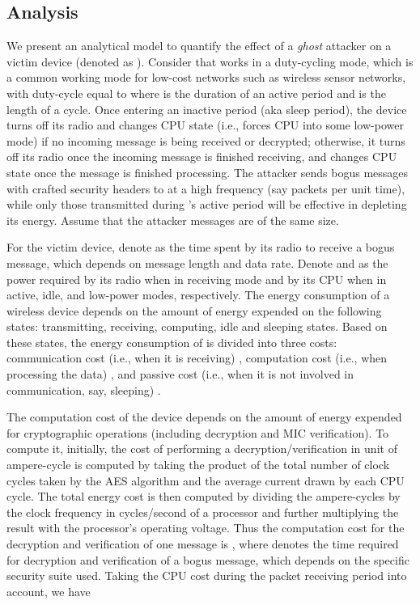\documentclass[10pt,journal,cspaper,compsoc]{IEEEtran}
\begin{document}
\subsection{Analysis}\label{sec:analysis}
We present an analytical model to quantify the effect of a {\em ghost} attacker on a victim device (denoted as ). Consider that  works in a duty-cycling mode, which is a common working mode for low-cost networks such as wireless sensor networks, with duty-cycle equal to  where  is the duration of an active period and  is the length of a cycle. Once entering an inactive period (aka sleep period), the device turns off its radio and changes CPU state (i.e., forces CPU into some low-power mode) if no incoming message is being received or decrypted; otherwise, it turns off its radio once the incoming message is finished receiving, and changes CPU state once the message is finished processing. The attacker sends bogus messages with crafted security headers to  at a high frequency (say  packets per unit time), while only those transmitted during 's active period will be effective in depleting its energy. Assume that the attacker messages are of the same size.

For the victim device, denote  as the time spent by its radio to receive a bogus message, which depends on message length and data rate. Denote  and  as the power required by its radio when in receiving mode and by its CPU when in active, idle, and low-power modes, respectively. The energy consumption of a wireless device depends on the amount of energy expended on the following states: transmitting, receiving, computing, idle and sleeping states. Based on these states, the energy consumption of  is divided  into three costs: communication cost (i.e., when it is receiving) , computation cost (i.e., when processing the data) , and passive cost (i.e., when it is not involved in communication, say, sleeping) .

The computation cost of the device depends on the amount of energy expended for cryptographic operations (including decryption and MIC verification). To compute it, initially, the cost of performing a decryption/verification in unit of ampere-cycle is computed by taking the product of the total number of clock cycles taken by the AES algorithm and the average current drawn by each CPU cycle. The total energy cost is then computed by dividing the  ampere-cycles by the clock frequency in cycles/second of a processor and further multiplying the result with the processor's operating voltage. Thus the computation cost for the decryption and verification of one message is , where  denotes the time required for decryption and verification of a bogus message, which depends on the specific security suite used. Taking the CPU cost during the packet receiving period into account, we have
\end{document}
